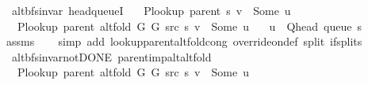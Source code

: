 \begin{isabellebody}
{\isafoldproof}%
%
\isadelimproof
\isanewline
%
\endisadelimproof
%
\isadeliminvisible
\isanewline
%
\endisadeliminvisible
%
\isataginvisible
{}\isamarkupfalse%
\ {\isacharparenleft}{\kern0pt}\ alt{\isacharunderscore}{\kern0pt}bfs{\isacharunderscore}{\kern0pt}invar{\isacharparenright}{\kern0pt}\ head{\isacharunderscore}{\kern0pt}queueI{\isacharcolon}{\kern0pt}\isanewline
\ \ \ {\isachardoublequoteopen}P{\isacharunderscore}{\kern0pt}lookup\ {\isacharparenleft}{\kern0pt}parent\ s{\isacharparenright}{\kern0pt}\ v\ {\isasymnoteq}\ Some\ u{\isachardoublequoteclose}\isanewline
\ \ \ {\isachardoublequoteopen}P{\isacharunderscore}{\kern0pt}lookup\ {\isacharparenleft}{\kern0pt}parent\ {\isacharparenleft}{\kern0pt}alt{\isacharunderscore}{\kern0pt}fold\ G{}\ G{}\ src\ s{\isacharparenright}{\kern0pt}{\isacharparenright}{\kern0pt}\ v\ {\isacharequal}{\kern0pt}\ Some\ u{\isachardoublequoteclose}\isanewline
\ \ \ {\isachardoublequoteopen}u\ {\isacharequal}{\kern0pt}\ Q{\isacharunderscore}{\kern0pt}head\ {\isacharparenleft}{\kern0pt}queue\ s{\isacharparenright}{\kern0pt}{\isachardoublequoteclose}%
\endisataginvisible
{\isafoldinvisible}%
%
\isadeliminvisible
\isanewline
%
\endisadeliminvisible
%
\isadelimproof
\ \ %
\endisadelimproof
%
\isatagproof
{}\isamarkupfalse%
\ assms\isanewline
\ \ \isamarkupfalse%
\ {\isacharparenleft}{\kern0pt}simp\ add{\isacharcolon}{\kern0pt}\ lookup{\isacharunderscore}{\kern0pt}parent{\isacharunderscore}{\kern0pt}alt{\isacharunderscore}{\kern0pt}fold{\isacharunderscore}{\kern0pt}cong\ override{\isacharunderscore}{\kern0pt}on{\isacharunderscore}{\kern0pt}def\ split{\isacharcolon}{\kern0pt}\ if{\isacharunderscore}{\kern0pt}splits{\isacharparenleft}{\kern0pt}{}{\isacharparenright}{\kern0pt}{\isacharparenright}{\kern0pt}%
\endisatagproof
{\isafoldproof}%
%
\isadelimproof
\isanewline
%
\endisadelimproof
\isanewline
{}\isamarkupfalse%
\ {\isacharparenleft}{\kern0pt}\ alt{\isacharunderscore}{\kern0pt}bfs{\isacharunderscore}{\kern0pt}invar{\isacharunderscore}{\kern0pt}not{\isacharunderscore}{\kern0pt}DONE{\isacharparenright}{\kern0pt}\ parent{\isacharunderscore}{\kern0pt}imp{\isacharunderscore}{\kern0pt}alt{\isacharunderscore}{\kern0pt}alt{\isacharunderscore}{\kern0pt}fold{\isacharcolon}{\kern0pt}\isanewline
\ \ \ {\isachardoublequoteopen}P{\isacharunderscore}{\kern0pt}lookup\ {\isacharparenleft}{\kern0pt}parent\ {\isacharparenleft}{\kern0pt}alt{\isacharunderscore}{\kern0pt}fold\ G{}\ G{}\ src\ s{\isacharparenright}{\kern0pt}{\isacharparenright}{\kern0pt}\ v\ {\isacharequal}{\kern0pt}\ Some\ u{\isachardoublequoteclose}\isanewline

\end{isabellebody}
